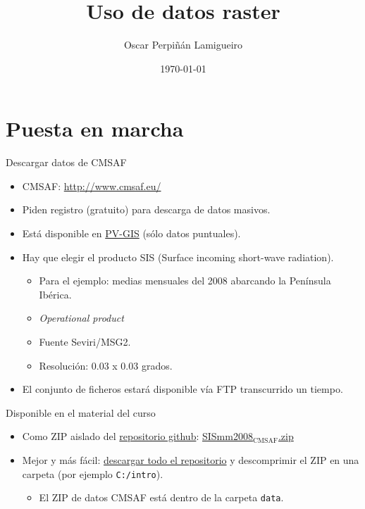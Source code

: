 \documentclass[xcolor={usenames,svgnames,dvipsnames}]{beamer}
\author{Oscar Perpiñán Lamigueiro}
\date{\today}
\title{Uso de datos raster}
\begin{document}
\maketitle

\section{Puesta en marcha}
\label{sec-1}

\begin{frame}[label=sec-1-1]{Descargar datos de CMSAF}
\begin{itemize}
\item CMSAF: \url{http://www.cmsaf.eu/}
\item Piden registro (gratuito) para descarga de datos masivos.
\item Está disponible en \href{http://re.jrc.ec.europa.eu/pvgis/apps4/pvest.php}{PV-GIS} (sólo datos puntuales).
\item Hay que elegir el producto SIS (Surface incoming short-wave radiation).
\begin{itemize}
\item Para el ejemplo: medias mensuales del 2008 abarcando la Península Ibérica.
\item \emph{Operational product}
\item Fuente Seviri/MSG2.
\item Resolución: 0.03 x 0.03 grados.
\end{itemize}
\item El conjunto de ficheros estará disponible vía FTP transcurrido un tiempo.
\end{itemize}
\end{frame}
\begin{frame}[fragile,label=sec-1-2]{Disponible en el material del curso}
 \begin{itemize}
\item Como ZIP aislado del \href{https://github.com/oscarperpinan/intro}{repositorio github}: \href{https://github.com/oscarperpinan/intro/blob/master/data/SISmm2008_CMSAF.zip}{SISmm2008$_{\text{CMSAF}}$.zip}
\item Mejor y más fácil: \href{https://github.com/oscarperpinan/intro/archive/master.zip}{descargar todo el repositorio} y descomprimir el ZIP en una carpeta (por ejemplo \texttt{C:/intro}).
\begin{itemize}
\item El ZIP de datos CMSAF está dentro de la carpeta \texttt{data}.
\end{itemize}
\end{itemize}
\end{frame}
\end{document}
